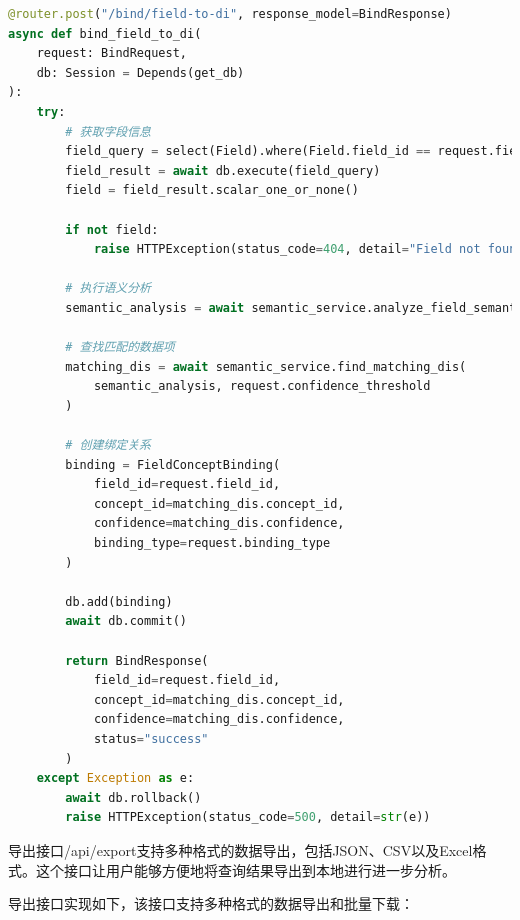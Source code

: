 \begin{lstlisting}[language=Python, label=fig:bind_api]
@router.post("/bind/field-to-di", response_model=BindResponse)
async def bind_field_to_di(
    request: BindRequest,
    db: Session = Depends(get_db)
):
    try:
        # 获取字段信息
        field_query = select(Field).where(Field.field_id == request.field_id)
        field_result = await db.execute(field_query)
        field = field_result.scalar_one_or_none()
        
        if not field:
            raise HTTPException(status_code=404, detail="Field not found")
        
        # 执行语义分析
        semantic_analysis = await semantic_service.analyze_field_semantics(field)
        
        # 查找匹配的数据项
        matching_dis = await semantic_service.find_matching_dis(
            semantic_analysis, request.confidence_threshold
        )
        
        # 创建绑定关系
        binding = FieldConceptBinding(
            field_id=request.field_id,
            concept_id=matching_dis.concept_id,
            confidence=matching_dis.confidence,
            binding_type=request.binding_type
        )
        
        db.add(binding)
        await db.commit()
        
        return BindResponse(
            field_id=request.field_id,
            concept_id=matching_dis.concept_id,
            confidence=matching_dis.confidence,
            status="success"
        )
    except Exception as e:
        await db.rollback()
        raise HTTPException(status_code=500, detail=str(e))
\end{lstlisting}

导出接口/api/export支持多种格式的数据导出，包括JSON、CSV以及Excel格式。这个接口让用户能够方便地将查询结果导出到本地进行进一步分析。

导出接口实现如下，该接口支持多种格式的数据导出和批量下载：

